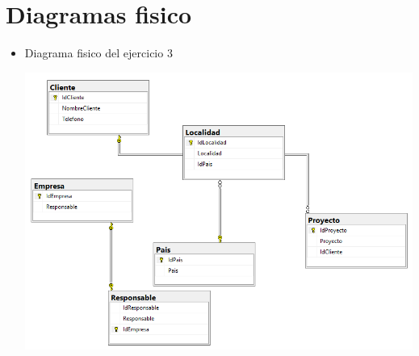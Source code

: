 \section{Diagramas fisico} 

\begin{itemize}
	\item Diagrama fisico del ejercicio 3
	\\
	\begin{center}
	\includegraphics[width=13cm]{./Imagenes/mf_ejer3} 
	\end{center}



\end{itemize} 